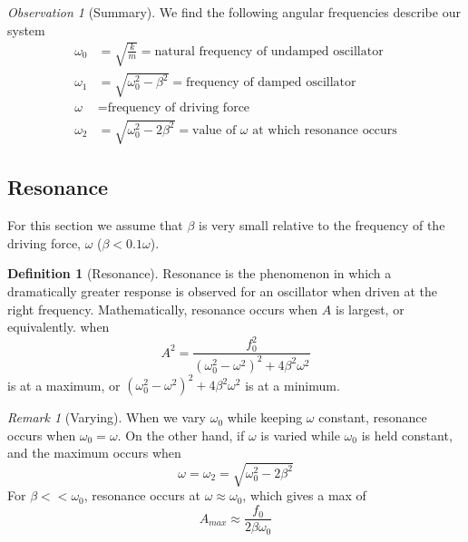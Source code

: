 \documentclass[12pt]{article}
\theoremstyle{definition}
\newtheorem{defn}[thm]{Definition}
\theoremstyle{remark}
\newtheorem{rmk}[thm]{Remark}
\newtheorem{obs}[thm]{Observation}
\numberwithin{equation}{section}
\begin{document}
\vspace{15pt}

\begin{obs}[Summary]
        We find the following angular frequencies describe our system \begin{align}
                \omega_0 &= \sqrt{\frac{k}{m}} = \text{natural frequency of undamped oscillator} \\
                \omega_1 &= \sqrt{\omega_0^2-\beta^2} = \text{frequency of damped oscillator} \\
                \omega &= \text{frequency of driving force} \\
                \omega_2 &= \sqrt{\omega_0^2-2\beta^2} = \text{value of $\omega$ at which resonance occurs}
        \end{align}
\end{obs}




\vspace{15pt}

\subsection{Resonance}


For this section we assume that $\beta$ is very small relative to the frequency of the driving force, $\omega$ ($\beta < 0.1\omega$).


\begin{defn}[Resonance]
        Resonance is the phenomenon in which a dramatically greater response is observed for an oscillator when driven at the right frequency. Mathematically, resonance occurs when $A$ is largest, or equivalently. when \begin{equation}
                A^2 = \frac{f_0^2}{(\omega_0^2-\omega^2)^2+4\beta^2\omega^2}
        \end{equation}
        is at a maximum, or $(\omega_0^2-\omega^2)^2+4\beta^2\omega^2$ is at a minimum.
\end{defn}

\vspace{15pt}

\begin{rmk}[Varying]
        When we vary $\omega_0$ while keeping $\omega$ constant, resonance occurs when $\omega_0 = \omega$. On the other hand, if $\omega$ is varied while $\omega_0$ is held constant, and the maximum occurs when \begin{equation}
                \omega = \omega_2 = \sqrt{\omega_0^2-2\beta^2}
        \end{equation}
        For $\beta << \omega_0$, resonance occurs at $\omega \approx \omega_0$, which gives a max of \begin{equation}
                A_{max} \approx \frac{f_0}{2\beta\omega_0}
        \end{equation}
\end{rmk}
\vspace{15pt}
\end{document}

